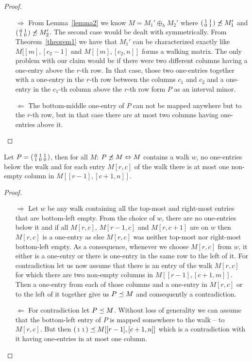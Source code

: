 \begin{proof}
\begin{itemize}
\item[$\Rightarrow$] From Lemma~\ref{lemma2} we know $M=M_1'\oplus_hM_2'$ where $\left(\begin{smallmatrix}1&1\\0&1\end{smallmatrix}\right)\not\preceq M_1'$ and $\left(\begin{smallmatrix}0&1\\1&0\end{smallmatrix}\right)\not\preceq M_2'$. The second case would be dealt with symmetrically. From Theorem~\ref{theorem1} we have that $M_1'$ can be characterized exactly like $M[[m],[c_2-1]$ and $M[[m],[c_2,n]]$ forms a walking matrix. The only problem with our claim would be if there were two different columns having a one-entry above the $r$-th row. In that case, those two one-entries together with a one-entry in the $r$-th row between the columns $c_1$ and $c_2$ and a one-entry in the $c_1$-th column above the $r$-th row form $P$ as an interval minor.
\item[$\Leftarrow$] The bottom-middle one-entry of $P$ can not be mapped anywhere but to the $r$-th row, but in that case there are at most two columns having one-entries above it. %
\end{itemize}
\end{proof}
\begin{thm}
Let $P=\left(\begin{smallmatrix}0&1&1\\1&0&0\end{smallmatrix}\right)$, then for all $M$: $P\not\preceq M\Leftrightarrow M$ contains a walk $w$, no one-entries below the walk and for each entry $M[r,c]$ of the walk there is at most one non-empty column in $M[[r-1],[c+1,n]]$.
\end{thm}
\begin{proof}
\begin{itemize}
\item[$\Rightarrow$] Let $w$ be any walk containing all the top-most and right-most entries that are bottom-left empty. From the choice of $w$, there are no one-entries below it and if all $M[r,c]$, $M[r-1,c]$ and $M[r,c+1]$ are on $w$ then $M[r,c]$ is a one-entry as else $M[r,c]$ was neither top-most nor right-most bottom-left empty. As a consequence, whenever we choose $M[r,c]$ from $w$, it either is a one-entry or there is one-entry in the same row to the left of it. For contradiction let us now assume that there is an entry of the walk $M[r,c]$ for which there are two non-empty columns in $M[[r-1],[c+1,m]]$. Then a one-entry from each of those columns and a one-entry in $M[r,c]$ or to the left of it together give us $P\preceq M$ and consequently a contradiction. 
\item[$\Leftarrow$] For contradiction let $P\preceq M$. Without loss of generality we can assume that the bottom-left entry of $P$ is mapped somewhere to the walk -- to $M[r,c]$. But then $\left(\begin{smallmatrix}1&1\end{smallmatrix}\right)\preceq M[[r-1],[c+1,n]]$ which is a contradiction with it having one-entries in at most one column.
\end{itemize}
\end{proof}

